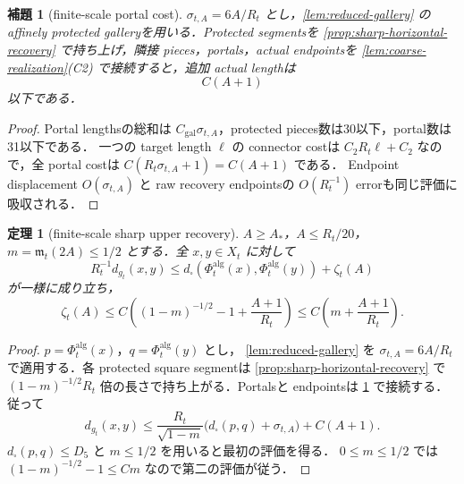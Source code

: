 \documentclass[a4paper,11pt]{ltjsarticle}
\numberwithin{equation}{section}
\theoremstyle{plain}
\newtheorem{theorem}{定理}[section]
\newtheorem{lemma}[lemma]{補題}
\theoremstyle{definition}
\theoremstyle{remark}
\begin{document}
\begin{lemma}[finite-scale portal cost]\label{lem:portal-cost}
$\sigma_{t,A}=6A/R_t$ とし，\cref{lem:reduced-gallery} の affinely protected galleryを用いる．Protected segmentsを
\cref{prop:sharp-horizontal-recovery} で持ち上げ，隣接 pieces，portals，actual endpointsを
\cref{lem:coarse-realization}(C2) で接続すると，追加 actual lengthは
\begin{equation}\label{eq:portal-cost-quantitative}
 C(A+1)
\end{equation}
以下である．
\end{lemma}

\begin{proof}
Portal lengthsの総和は $C_{\mathrm{gal}}\sigma_{t,A}$，protected pieces数は30以下，portal数は31以下である．
一つの target length $\ell$ の connector costは $C_2R_t\ell+C_2$ なので，全 portal costは
$C(R_t\sigma_{t,A}+1)=C(A+1)$ である．
Endpoint displacement $O(\sigma_{t,A})$ と raw recovery endpointsの $O(R_t^{-1})$ errorも同じ評価に吸収される．
\end{proof}

\begin{theorem}[finite-scale sharp upper recovery]\label{thm:sharp-upper}
$A\ge A_*$，$A\le R_t/20$，$m=\mathfrak m_t(2A)\le1/2$ とする．全 $x,y\in X_t$ に対して
\begin{equation}\label{eq:global-upper}
 R_t^{-1}d_{g_t}(x,y)
 \le d_\square(\Phi_t^{\mathrm{alg}}(x),\Phi_t^{\mathrm{alg}}(y))+\zeta_t(A)
\end{equation}
が一様に成り立ち，
\begin{equation}\label{eq:upper-error-bound}
 \zeta_t(A)
 \le C\left((1-m)^{-1/2}-1+\frac{A+1}{R_t}\right)
 \le C\left(m+\frac{A+1}{R_t}\right).
\end{equation}
\end{theorem}

\begin{proof}
$p=\Phi_t^{\mathrm{alg}}(x)$，$q=\Phi_t^{\mathrm{alg}}(y)$ とし，
\cref{lem:reduced-gallery} を $\sigma_{t,A}=6A/R_t$ で適用する．各 protected square segmentは
\cref{prop:sharp-horizontal-recovery} で $(1-m)^{-1/2}R_t$ 倍の長さで持ち上がる．Portalsと endpointsは
\cref{lem:portal-cost} で接続する．従って
\[
 d_{g_t}(x,y)
 \le \frac{R_t}{\sqrt{1-m}}
       \bigl(d_\square(p,q)+\sigma_{t,A}\bigr)+C(A+1).
\]
$d_\square(p,q)\le D_5$ と $m\le1/2$ を用いると最初の評価を得る．
$0\le m\le1/2$ では $(1-m)^{-1/2}-1\le Cm$ なので第二の評価が従う．
\end{proof}
\end{document}
